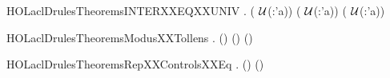 \newcommand{\HOLaclDrulesTheoremsilXXdomi}{\UseVerbatim{HOLaclDrulesTheoremsilXXdomi}}
\begin{SaveVerbatim}{HOLaclDrulesTheoremsINTERXXEQXXUNIV}
\HOLTokenTurnstile{} \HOLSymConst{\HOLTokenForall{}} . ( \HOLConst{\HOLTokenInter{}}  \HOLSymConst{=} \ensuremath{\cal{U}}(:'a)) \HOLSymConst{\HOLTokenEquiv{}} ( \HOLSymConst{=} \ensuremath{\cal{U}}(:'a)) \HOLSymConst{\HOLTokenConj{}} ( \HOLSymConst{=} \ensuremath{\cal{U}}(:'a))
\end{SaveVerbatim}
\newcommand{\HOLaclDrulesTheoremsINTERXXEQXXUNIV}{\UseVerbatim{HOLaclDrulesTheoremsINTERXXEQXXUNIV}}
\begin{SaveVerbatim}{HOLaclDrulesTheoremsModusXXTollens}
\HOLTokenTurnstile{} \HOLSymConst{\HOLTokenForall{}}    .
     (\HOLSymConst{,}\HOLSymConst{,})     \HOLSymConst{\HOLTokenImp{}}
     (\HOLSymConst{,}\HOLSymConst{,})    \HOLSymConst{\HOLTokenImp{}}
     (\HOLSymConst{,}\HOLSymConst{,})   
\end{SaveVerbatim}
\newcommand{\HOLaclDrulesTheoremsModusXXTollens}{\UseVerbatim{HOLaclDrulesTheoremsModusXXTollens}}
\begin{SaveVerbatim}{HOLaclDrulesTheoremsRepXXControlsXXEq}
\HOLTokenTurnstile{} \HOLSymConst{\HOLTokenForall{}}     .
     (\HOLSymConst{,}\HOLSymConst{,})      \HOLSymConst{\HOLTokenEquiv{}}
     (\HOLSymConst{,}\HOLSymConst{,})      
\end{SaveVerbatim}
\newcommand{\HOLaclDrulesTheoremsRepXXControlsXXEq}{\UseVerbatim{HOLaclDrulesTheoremsRepXXControlsXXEq}}
